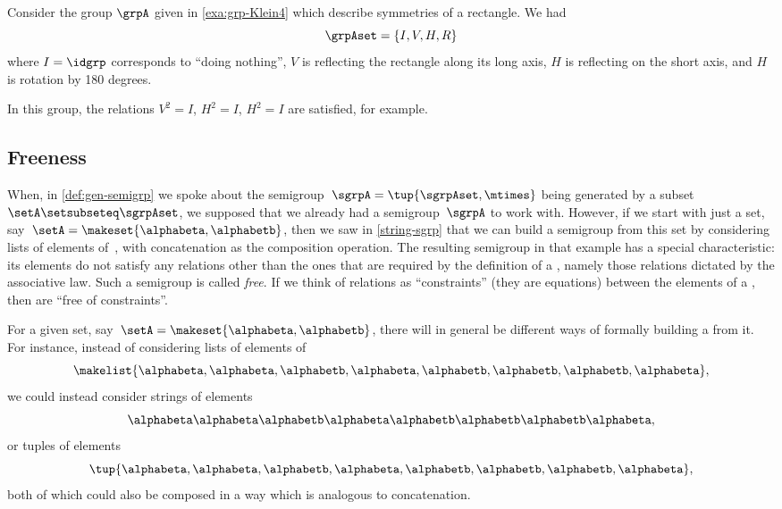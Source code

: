 \begin{example}
    Consider the group $\grpA$ given in \cref{exa:grp-Klein4} which describe symmetries of a rectangle.
    We had
    \begin{equation}
        \grpAset = \{ I, V, H, R\}
    \end{equation}
    where $I = \idgrp$ corresponds to ``doing nothing'', $V$ is reflecting the rectangle along its long axis, $H$ is reflecting on the short axis, and $H$ is rotation by 180 degrees.

    In this group, the relations $V^2 = I$, $H^2 = I$, $H^2 = I$ are satisfied, for example.
\end{example}

\subsection{Freeness}

When, in \cref{def:gen-semigrp} we spoke about the semigroup~$\sgrpA = \tup{\sgrpAset, \mtimes}$  being generated by a subset~$\setA \setsubseteq \sgrpAset$, we supposed that we already had a semigroup~$\sgrpA$ to work with.
However, if we start with just a set, say~$\setA = \makeset{ \alphabeta, \alphabetb}$, then we saw in \cref{string-sgrp} that we can build a semigroup from this set by considering lists of elements of~\setA, with concatenation as the composition operation.
The resulting semigroup in that example has a special characteristic: its elements do not satisfy any relations other than the ones that are required by the definition of a   , namely those relations dictated by the associative law.
Such a semigroup is called \emph{free}.
If we think of relations as ``constraints'' (they are equations) between the elements of a  , then  are ``free of constraints''.

For a given set, say~$\setA = \makeset{ \alphabeta, \alphabetb}$, there will in general be different ways of formally building a  from it.
For instance, instead of considering lists of elements of~\setA
\begin{equation}
    \makelist{\alphabeta,\alphabeta, \alphabetb, \alphabeta, \alphabetb, \alphabetb, \alphabetb, \alphabeta},
\end{equation}
we could instead consider strings of elements
\begin{equation}
    \alphabeta\alphabeta \alphabetb \alphabeta \alphabetb \alphabetb \alphabetb \alphabeta,
\end{equation}
or tuples of elements
\begin{equation}
    \tup{ \alphabeta, \alphabeta,  \alphabetb,  \alphabeta,  \alphabetb,  \alphabetb,  \alphabetb,  \alphabeta},
\end{equation}
both of which could also be composed in a way which is analogous to concatenation.

